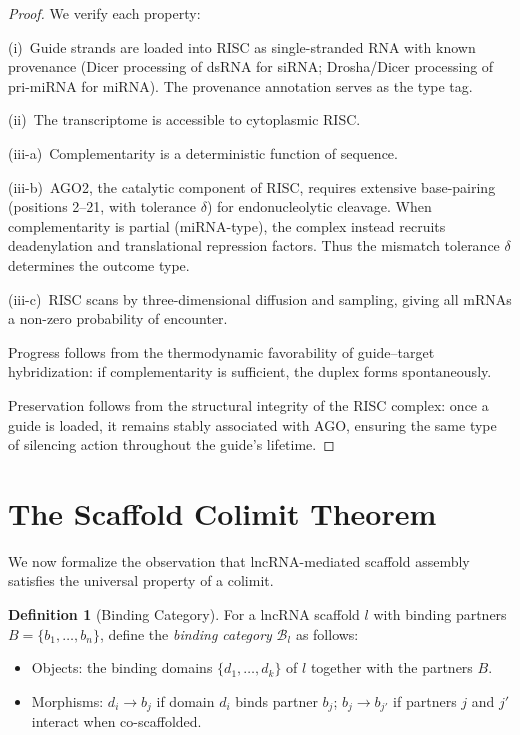 \documentclass[12pt,a4paper]{article}
\theoremstyle{definition}
\newtheorem{definition}[theorem]{Definition}
\begin{document}
\begin{proof}
We verify each property:

(i)~Guide strands are loaded into RISC as single-stranded RNA with
known provenance (Dicer processing of dsRNA for siRNA; Drosha/Dicer
processing of pri-miRNA for miRNA).  The provenance annotation serves
as the type tag.

(ii)~The transcriptome is accessible to cytoplasmic RISC.

(iii-a)~Complementarity is a deterministic function of sequence.

(iii-b)~AGO2, the catalytic component of RISC, requires extensive
base-pairing (positions 2--21, with tolerance $\delta$) for
endonucleolytic cleavage.  When complementarity is partial
(miRNA-type), the complex instead recruits deadenylation and
translational repression factors.  Thus the mismatch tolerance $\delta$
determines the outcome type.

(iii-c)~RISC scans by three-dimensional diffusion and sampling, giving
all mRNAs a non-zero probability of encounter.

Progress follows from the thermodynamic favorability of
guide--target hybridization: if complementarity is sufficient, the
duplex forms spontaneously.

Preservation follows from the structural integrity of the RISC complex:
once a guide is loaded, it remains stably associated with AGO, ensuring
the same type of silencing action throughout the guide's lifetime.
\end{proof}

\section{The Scaffold Colimit Theorem}\label{sec:scaffold-colimit}

We now formalize the observation that lncRNA-mediated scaffold assembly
satisfies the universal property of a colimit.

\begin{definition}[Binding Category]\label{def:binding-cat}
For a lncRNA scaffold $l$ with binding partners $B = \{b_1, \ldots,
b_n\}$, define the \emph{binding category} $\mathcal{B}_l$ as follows:
\begin{itemize}
  \item Objects: the binding domains $\{d_1, \ldots, d_k\}$ of $l$
    together with the partners $B$.
  \item Morphisms: $d_i \to b_j$ if domain $d_i$ binds partner $b_j$;
    $b_j \to b_{j'}$ if partners $j$ and $j'$ interact when
    co-scaffolded.
\end{itemize}
\end{definition}
\end{document}
